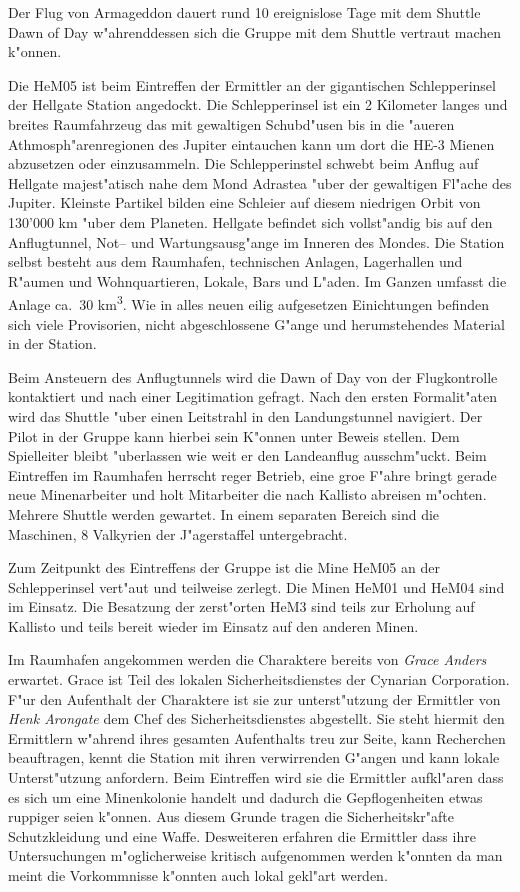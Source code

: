 
Der Flug von Armageddon dauert rund 10 ereignislose Tage  mit dem Shuttle Dawn of Day w"ahrenddessen sich die Gruppe mit dem Shuttle vertraut machen k"onnen. 

Die HeM05 ist beim Eintreffen der Ermittler an der gigantischen Schlepperinsel der Hellgate Station angedockt. Die Schlepperinsel ist ein 2 Kilometer langes und breites Raumfahrzeug das mit gewaltigen Schubd"usen bis in die "au\3eren Athmosph"arenregionen des Jupiter eintauchen kann um dort die HE-3 Mienen abzusetzen oder einzusammeln. Die Schlepperinstel schwebt beim Anflug auf Hellgate majest"atisch nahe dem Mond Adrastea "uber der gewaltigen Fl"ache des Jupiter. Kleinste Partikel bilden eine Schleier auf diesem niedrigen Orbit von 130'000 km "uber dem Planeten. Hellgate befindet sich vollst"andig bis auf den Anflugtunnel, Not-- und Wartungsausg"ange im Inneren des Mondes. Die Station selbst besteht aus dem Raumhafen, technischen Anlagen, Lagerhallen und R"aumen und Wohnquartieren, Lokale, Bars und L"aden. Im Ganzen umfasst die Anlage ca.~30 km\textsuperscript{3}. Wie in alles neuen eilig aufgesetzen Einichtungen befinden sich viele Provisorien, nicht abgeschlossene G"ange und herumstehendes Material in der Station.

Beim Ansteuern des Anflugtunnels wird die Dawn of Day von der Flugkontrolle kontaktiert und nach einer Legitimation gefragt. Nach den ersten Formalit"aten wird das Shuttle "uber einen Leitstrahl in den Landungstunnel navigiert. Der Pilot in der Gruppe kann hierbei sein K"onnen unter Beweis\3 stellen. Dem Spielleiter bleibt "uberlassen wie weit er den Landeanflug ausschm"uckt. Beim Eintreffen im Raumhafen herrscht reger Betrieb, eine gro\3e F"ahre bringt gerade neue Minenarbeiter und holt Mitarbeiter die nach Kallisto abreisen m"ochten. Mehrere Shuttle werden gewartet. In einem separaten Bereich sind die Maschinen, 8 Valkyrien der J"agerstaffel untergebracht. 

Zum Zeitpunkt des Eintreffens der Gruppe ist die Mine HeM05 an der Schlepperinsel vert"aut und teilweise zerlegt. Die Minen HeM01 und HeM04 sind im Einsatz. Die Besatzung der zerst"orten HeM3 sind teils zur Erholung auf Kallisto und teils bereit wieder im Einsatz auf den anderen Minen.

Im Raumhafen angekommen werden die Charaktere bereits von \emph{Grace Anders} erwartet. Grace ist Teil des lokalen Sicherheitsdienstes der Cynarian Corporation. F"ur den Aufenthalt der Charaktere ist sie zur unterst"utzung der Ermittler von \emph{Henk Arongate} dem Chef des Sicherheitsdienstes abgestellt. Sie steht hiermit den Ermittlern w"ahrend ihres gesamten Aufenthalts treu zur Seite, kann Recherchen beauftragen, kennt die Station mit ihren verwirrenden G"angen und kann lokale Unterst"utzung anfordern. Beim Eintreffen wird sie die Ermittler aufkl"aren dass es sich um eine Minenkolonie handelt und dadurch die Gepflogenheiten etwas ruppiger seien k"onnen. Aus diesem Grunde tragen die Sicherheitskr"afte Schutzkleidung und eine Waffe. Desweiteren erfahren die Ermittler dass ihre Untersuchungen m"oglicherweise kritisch aufgenommen werden k"onnten da man meint die Vorkommnisse k"onnten auch lokal gekl"art werden.

